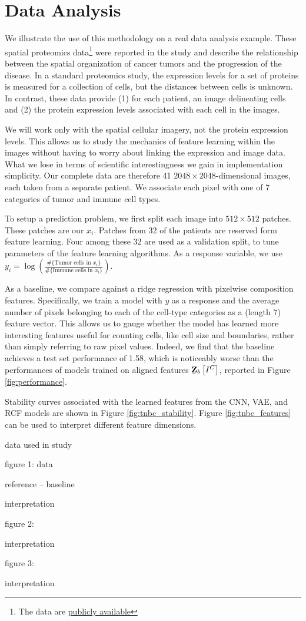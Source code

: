 
\section{Data Analysis}

We illustrate the use of this methodology on a real data analysis example. These
spatial proteomics data\footnote{The data are
  \href{https://www.angelolab.com/mibi-data}{publicly available}} were reported
in the study \citep{keren2018structured} and describe the relationship between
the spatial organization of cancer tumors and the progression of the disease. In
a standard proteomics study, the expression levels for a set of proteins is
measured for a collection of cells, but the distances between cells is unknown.
In contrast, these data provide (1) for each patient, an image delineating cells
and (2) the protein expression levels associated with each cell in the images.

We will work only with the spatial cellular imagery, not the protein expression
levels. This allows us to study the mechanics of feature learning within the
images without having to worry about linking the expression and image data. What
we lose in terms of scientific interestingness we gain in implementation
simplicity. Our complete data are therefore 41 $2048 \times 2048$-dimensional
images, each taken from a separate patient. We associate each pixel with one of
7 categories of tumor and immune cell types.

To setup a prediction problem, we first split each image into $512 \times 512$
patches. These patches are our $x_{i}$. Patches from 32 of the patients are
reserved form feature learning. Four among these 32 are used as a validation
split, to tune parameters of the feature learning algorithms. As a response
variable, we use $y_{i} = \log\left(\frac{\#\{\text{Tumor cells in }x_{i}\}}{\#\{\text{Immune cells in }x_i\}}\right)$.

As a baseline, we compare against a ridge regression with pixelwise composition
features. Specifically, we train a model with $y$ as a response and the average
number of pixels belonging to each of the cell-type categories as a (length 7)
feature vector. This allows us to gauge whether the model has learned more
interesting features useful for counting cells, like cell size and boundaries,
rather than simply referring to raw pixel values. Indeed, we find that the
baseline achieves a test set performance of 1.58, which is noticeably worse than
the performances of models trained on aligned features
$\underaccent{\bar}{\mathbf{Z}}_{b}\left[I^{C}\right]$, reported in Figure
\ref{fig:performance}.

Stability curves associated with the learned features from the CNN, VAE, and RCF
models are shown in Figure \ref{fig:tnbc_stability}. Figure
\ref{fig:tnbc_features} can be used to interpret different feature dimensions.


data used in study

figure 1: data

reference -- baseline

interpretation

figure 2:

interpretation

figure 3:

interpretation
